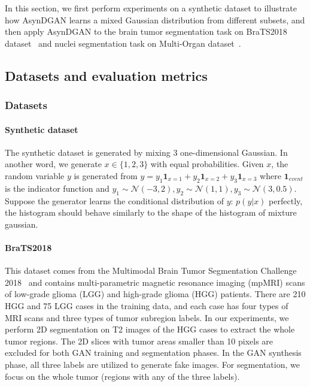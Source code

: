 In this section, we first perform experiments on a synthetic dataset to illustrate how AsynDGAN learns a mixed Gaussian distribution from different subsets, and then apply AsynDGAN to the brain tumor segmentation task on BraTS2018 dataset~\cite{bakas2018identifying} and nuclei segmentation task on Multi-Organ dataset~\cite{kumar2017dataset}.


\subsection{Datasets and evaluation metrics}
\subsubsection{Datasets}
\paragraph{Synthetic dataset}
The  synthetic dataset is generated by mixing $3$ one-dimensional Gaussian. In another word, we generate $x\in \{1,2,3\}$ with equal probabilities. Given $x$, the random variable $y$ is generated from  $y =y_1{\textbf{1}_{x=1}}+y_2{\textbf{1}_{x=2}}+y_3{\textbf{1}_{x=3}} $ where $\textbf{1}_{event}$ is the indicator function and $y_1\sim \mathcal{N}(-3,2),y_2\sim \mathcal{N}(1,1), y_3\sim\mathcal{N}(3,0.5)$. Suppose the generator learns the conditional distribution of $y$: $p(y|x)$ perfectly, the histogram should behave similarly to the shape of the histogram of mixture gaussian. 


\paragraph{BraTS2018}

This dataset comes from the Multimodal Brain Tumor Segmentation Challenge 2018~\cite{bakas2017advancing,bakas2018identifying,menze2014multimodal} and contains multi-parametric magnetic resonance imaging (mpMRI) scans of low-grade glioma (LGG) and high-grade glioma (HGG) patients. There are 210 HGG and 75 LGG cases in the training data, and each case has four types of MRI scans and three types of tumor subregion labels. In our experiments, we perform 2D segmentation on T2 images of the HGG cases to extract the whole tumor regions. The 2D slices with tumor areas smaller than 10 pixels are excluded for both GAN training and segmentation phases. In the GAN synthesis phase, all three labels are utilized to generate fake images. For segmentation, we focus on the whole tumor (regions with any of the three labels).

